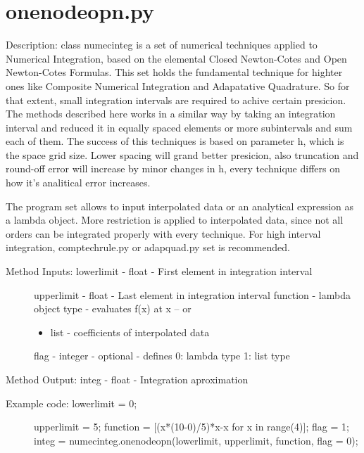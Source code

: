\documentclass[letterpaper,10pt,oneside]{sphinxmanual}
\theoremstyle{plain}%
\theoremstyle{definition}%
\theoremstyle{remark}%
\begin{document}
\section{onenodeopn.py}
\label{code:module-onenodeopn}\label{code:onenodeopn-py}
Description: class numecinteg is a set of numerical techniques applied to
Numerical Integration, based on the elemental Closed Newton-Cotes and
Open Newton-Cotes Formulas. This set holds the fundamental technique for
highter ones like Composite Numerical Integration and Adapatative Quadrature.
So for that extent, small integration intervals are required to achive certain
presicion. The methods described here works in a similar way by taking an
integration interval and reduced it in equally spaced elements or more 
subintervals and sum each of them. The success of this techniques is based
on parameter h, which is the space grid size. Lower spacing will grand better
presicion, also truncation and round-off error will increase by minor changes
in h, every technique differs on how it's analitical error increases.

The program set allows to input interpolated data or an analytical expression
as a lambda object. More restriction is applied to interpolated data, since
not all orders can be integrated properly with every technique. For high 
interval integration, comptechrule.py or adapquad.py set is recommended.
\begin{description}
\item[{Method Inputs: lowerlimit - float - First element in integration interval}] \leavevmode
upperlimit - float - Last element in integration interval
function - lambda object type - evaluates f(x) at x -- or
\begin{itemize}
\item {} 
list - coefficients of interpolated data

\end{itemize}

flag - integer - optional - defines 0: lambda type 1: list type

\end{description}

Method Output: integ - float - Integration aproximation
\begin{description}
\item[{Example code: lowerlimit = 0;}] \leavevmode
upperlimit = 5;
function = {[}(x*(10-0)/5)*x-x for x in range(4){]};
flag = 1;
integ =                   numecinteg.onenodeopn(lowerlimit, upperlimit, function, flag = 0);

\end{description}
\end{document}
